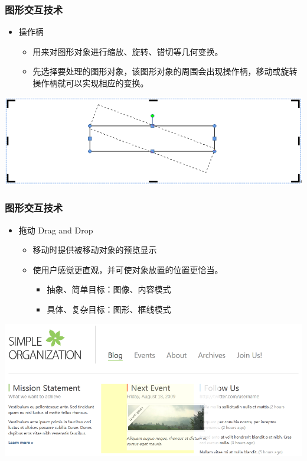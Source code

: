 \documentclass{beamer}
\begin{document}
\begin{frame}
	\frametitle{图形交互技术}
	\begin{itemize}
		\item 操作柄
		\begin{itemize}
			\item 用来对图形对象进行缩放、旋转、错切等几何变换。
			\item 先选择要处理的图形对象，该图形对象的周围会出现操作柄，移动或旋转操作柄就可以实现相应的变换。
		\end{itemize}
	\end{itemize}
	\begin{center}
	\includegraphics[width=.9\textwidth]{images/handle.png}
	\end{center}
\end{frame}

\begin{frame}
	\frametitle{图形交互技术}
	\begin{itemize}
		\item 拖动 Drag and Drop
		\begin{itemize}
			\item 移动时提供被移动对象的预览显示
			\item 使用户感觉更直观，并可使对象放置的位置更恰当。
			\begin{itemize}
				\item 抽象、简单目标：图像、内容模式
				\item 具体、复杂目标：图形、框线模式
			\end{itemize}
		\end{itemize}
	\end{itemize}
	\begin{center}
	\includegraphics[width=.9\textwidth]{images/drag-and-drop.png}
	\end{center}
\end{frame}
\end{document}
